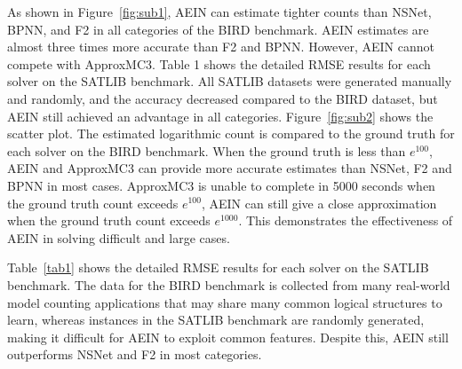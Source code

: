As shown in Figure~\ref{fig:sub1}, AEIN can estimate tighter counts than NSNet, BPNN, and F2 in all categories of the BIRD benchmark. 
AEIN estimates are almost three times more accurate than F2 and BPNN. However, AEIN cannot compete with ApproxMC3.
Table 1 shows the detailed RMSE results for each solver on the SATLIB benchmark. All SATLIB datasets were generated manually and 
randomly, and the accuracy decreased compared to the BIRD dataset, but AEIN still achieved an advantage in all categories.
Figure~\ref{fig:sub2} shows the scatter plot. The estimated logarithmic count is compared to the ground truth for each solver on 
the BIRD benchmark. When the ground truth is less than \(e^{100}\), AEIN and ApproxMC3 can provide more accurate estimates than NSNet, 
F2 and BPNN in most cases. ApproxMC3 is unable to complete in 5000 seconds when the ground truth count exceeds \(e^{100}\), AEIN can 
still give a close approximation when the ground truth count exceeds \(e^{1000}\). This demonstrates the effectiveness of AEIN in solving 
difficult and large cases.

Table~\ref{tab1} shows the detailed RMSE results for each solver on the SATLIB benchmark. The data for the BIRD benchmark is collected 
from many real-world model counting applications that may share many common logical structures to learn, whereas instances in the SATLIB 
benchmark are randomly generated, making it difficult for AEIN to exploit common features. Despite this, AEIN still outperforms NSNet 
and F2 in most categories.

